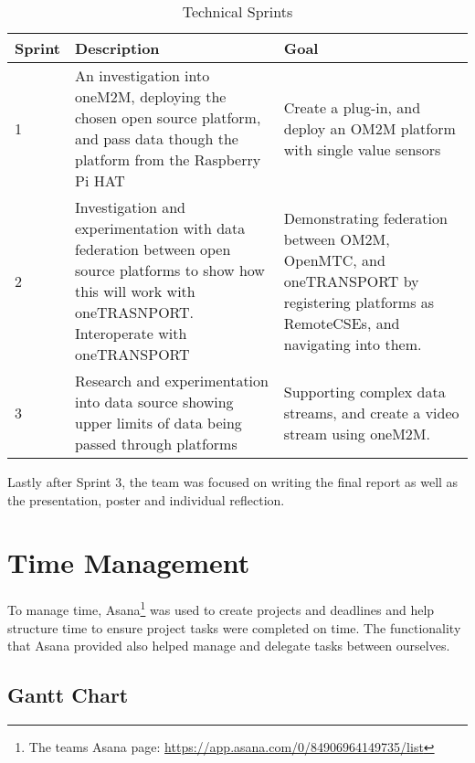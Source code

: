 \begin{table}[H]
\centering
\begin{tabularx}{\textwidth}{|l|X|X|}
\hline
\textbf{Sprint} & \textbf{Description}                                                                                                                                                 & \textbf{Goal}                                  \\ \hline
1               & An investigation into oneM2M, deploying the chosen open source platform, and pass data though the platform from the Raspberry Pi HAT                                                     & Create a plug-in, and deploy an OM2M platform with single value sensors \\ \hline
2               & Investigation and experimentation with data federation between open source platforms to show how this will work with oneTRASNPORT. Interoperate with oneTRANSPORT & Demonstrating federation between OM2M, OpenMTC, and oneTRANSPORT by registering platforms as RemoteCSEs, and navigating into them.           \\ \hline
3               & Research and experimentation into data source showing upper limits of data being passed through platforms                                                                 & Supporting complex data streams, and create a video stream using oneM2M.               \\ \hline
\end{tabularx}
\caption{Technical Sprints}
\label{technical-sprints}
\end{table}

Lastly after Sprint 3, the team was focused on writing the final report as well as the presentation, poster and individual reflection.

\section{Time Management}

To manage time, Asana\footnote{The teams Asana page: \url{https://app.asana.com/0/84906964149735/list}} was used to create projects and deadlines and help structure time to ensure project tasks were completed on time. The functionality that Asana provided also helped manage and delegate tasks between ourselves.

\subsection{Gantt Chart}

